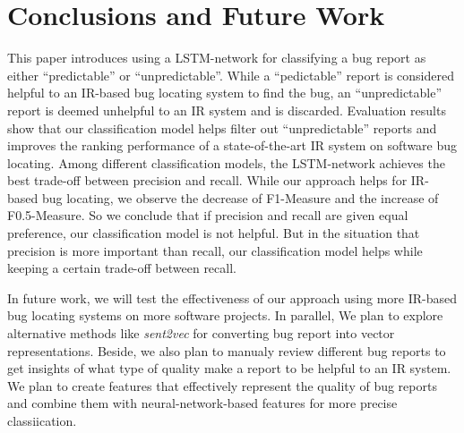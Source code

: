 \section{Conclusions and Future Work}
This paper introduces using a LSTM-network for classifying a bug report as either ``predictable'' or ``unpredictable''. While a ``pedictable'' report is considered helpful to an IR-based bug locating system to find the bug, an ``unpredictable'' report is deemed unhelpful to an IR system and is discarded. Evaluation results show that our classification model helps filter out ``unpredictable'' reports and improves the ranking performance of a state-of-the-art IR system on software bug locating. Among different classification models, the LSTM-network achieves the best trade-off between precision and recall. While our approach helps for IR-based bug locating, we observe the decrease of F1-Measure and the increase of F0.5-Measure. So we conclude that if precision and recall are given equal preference, our classification model is not helpful. But in the situation that precision is more important than recall, our classification model helps while keeping a certain trade-off between recall.

In future work, we will test the effectiveness of our approach using more IR-based bug locating systems on more software projects. In parallel, We plan to explore alternative methods like \textit{sent2vec} \cite{2017arXiv170302507P} for converting bug report into vector representations. Beside, we also plan to manualy review different bug reports to get insights of what type of quality make a report to be helpful to an IR system. We plan to create features that effectively represent the quality of bug reports and combine them with neural-network-based features for more precise classiication. 